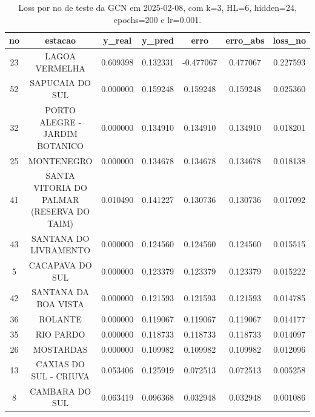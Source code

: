 \begin{table}[h]
\centering
\caption{Loss por no de teste da GCN em 2025-02-08, com k=3, HL=6, hidden=24, epochs=200 e lr=0.001.}
\label{tab:gcn_loss_k3_hl6_h24_e200_d20250208}
\begin{tabular}{ccccccc}
\toprule
no & estacao & y\_real & y\_pred & erro & erro\_abs & loss\_no \\
\midrule
23 & LAGOA VERMELHA & 0.609398 & 0.132331 & -0.477067 & 0.477067 & 0.227593 \\
52 & SAPUCAIA DO SUL & 0.000000 & 0.159248 & 0.159248 & 0.159248 & 0.025360 \\
32 & PORTO ALEGRE - JARDIM BOTANICO & 0.000000 & 0.134910 & 0.134910 & 0.134910 & 0.018201 \\
25 & MONTENEGRO & 0.000000 & 0.134678 & 0.134678 & 0.134678 & 0.018138 \\
41 & SANTA VITORIA DO PALMAR (RESERVA DO TAIM) & 0.010490 & 0.141227 & 0.130736 & 0.130736 & 0.017092 \\
43 & SANTANA DO LIVRAMENTO & 0.000000 & 0.124560 & 0.124560 & 0.124560 & 0.015515 \\
5 & CACAPAVA DO SUL & 0.000000 & 0.123379 & 0.123379 & 0.123379 & 0.015222 \\
42 & SANTANA DA BOA VISTA & 0.000000 & 0.121593 & 0.121593 & 0.121593 & 0.014785 \\
36 & ROLANTE & 0.000000 & 0.119067 & 0.119067 & 0.119067 & 0.014177 \\
35 & RIO PARDO & 0.000000 & 0.118733 & 0.118733 & 0.118733 & 0.014097 \\
26 & MOSTARDAS & 0.000000 & 0.109982 & 0.109982 & 0.109982 & 0.012096 \\
13 & CAXIAS DO SUL - CRIUVA & 0.053406 & 0.125919 & 0.072513 & 0.072513 & 0.005258 \\
8 & CAMBARA DO SUL & 0.063419 & 0.096368 & 0.032948 & 0.032948 & 0.001086 \\
\bottomrule
\end{tabular}
\end{table}
